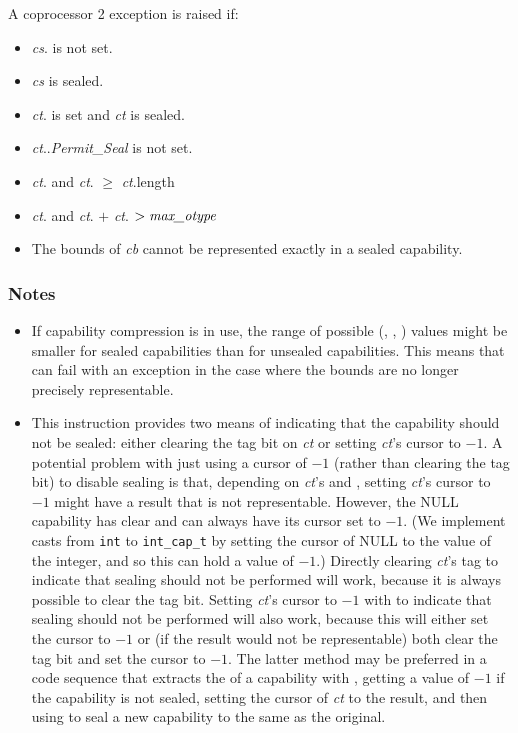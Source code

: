 A coprocessor 2 exception is raised if:

\begin{itemize}
\item
\emph{cs}.\ctag{} is not set.
\item
\emph{cs} is sealed.
\item
\emph{ct}.\ctag{} is set and \emph{ct} is sealed.
\item
\emph{ct}.\cperms.\emph{Permit\_Seal} is not set.
\item
\emph{ct}.\ctag{} and \emph{ct}.\coffset{} $\ge$ \emph{ct}.length{}
\item
\emph{ct}.\ctag{} and \emph{ct}.\cbase{} $+$ \emph{ct}.\coffset{} $> \emph{max\_otype}$
\item
The bounds of \emph{cb} cannot be represented exactly in a sealed capability.
\end{itemize}

\subsubsection*{Notes}

\begin{itemize}
\item
If capability compression is in use, the range of possible (\cbase{},
\clength{}, \coffset{}) values might be smaller for sealed capabilities
than for unsealed capabilities. This means that 
can fail with an exception in the case where the bounds are no longer
precisely representable.
\item
This instruction provides two means of indicating that the capability should
not be sealed: either clearing the tag bit on \emph{ct} or setting \emph{ct}'s
cursor to $-1$. A potential problem with just using a cursor of $-1$ (rather than
clearing the tag bit) to disable sealing is that, depending on \emph{ct}'s
\cbase{} and \coffset{}, setting \emph{ct}'s cursor to $-1$ might have a result
that is not representable. However, the NULL capability has \ctag{} clear
and can always have its cursor set to $-1$. (We implement casts from
\verb+int+ to \verb+int_cap_t+ by setting the cursor of NULL to the value of the
integer, and so this can hold a value of $-1$.) Directly clearing \emph{ct}'s
tag to indicate that sealing should not be performed will work, because it
is always possible to clear the tag bit. Setting \emph{ct}'s cursor to $-1$ with
 to indicate that sealing should not be performed will
also work, because this will either set the cursor to $-1$ or (if the result would
not be representable) both clear the tag bit and set the cursor to $-1$. The
latter method may be preferred in a code sequence that extracts the \cotype{}
of a capability with , getting a value of $-1$ if the
capability is not sealed, setting the cursor of \emph{ct} to the result, and
then using  to seal a new capability to the same
\cotype{} as the original.
\end{itemize}
